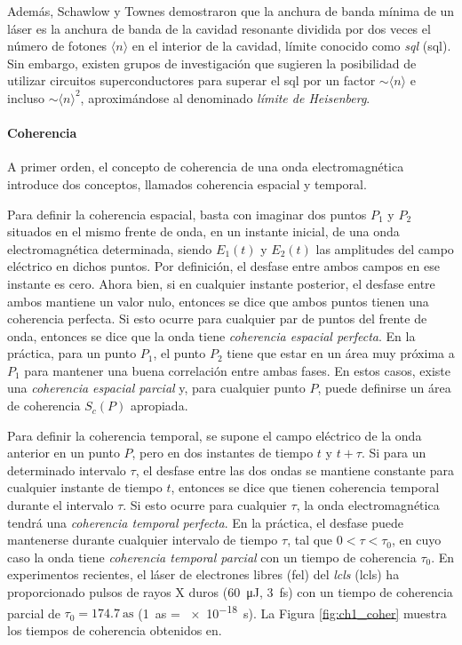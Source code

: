 Además, Schawlow y Townes demostraron que la anchura de banda mínima de un láser es la anchura de banda de la cavidad resonante dividida por dos veces el número de fotones $\langle n\rangle$ en el interior de la cavidad, límite conocido como \emph{\acrlong{sql}} (\acrshort{sql}). Sin embargo, existen grupos de investigación\autocite{Liu2021ProposalLimit} que sugieren la posibilidad de utilizar circuitos superconductores para superar el \acrshort{sql} por un factor $\sim\langle n\rangle$ e incluso $\sim\langle n\rangle^2$, aproximándose al denominado \emph{límite de Heisenberg}.

\paragraph{Coherencia}\label{par:1.1.2.2}
A primer orden, el concepto de coherencia de una onda electromagnética introduce dos conceptos, llamados coherencia espacial y temporal\autocite{Svelto2010PrinciplesLasers}.

Para definir la coherencia espacial, basta con imaginar dos puntos $P_1$ y $P_2$ situados en el mismo frente de onda, en un instante inicial, de una onda electromagnética determinada, siendo $E_1(t)$ y $E_2(t)$ las amplitudes del campo eléctrico en dichos puntos. Por definición, el desfase entre ambos campos en ese instante es cero. Ahora bien, si en cualquier instante posterior, el desfase entre ambos mantiene un valor nulo, entonces se dice que ambos puntos tienen una coherencia perfecta. Si esto ocurre para cualquier par de puntos del frente de onda, entonces se dice que la onda tiene \emph{coherencia espacial perfecta}. En la práctica, para un punto $P_1$, el punto $P_2$ tiene que estar en un área muy próxima a $P_1$ para mantener una buena correlación entre ambas fases. En estos casos, existe una \emph{coherencia espacial parcial} y, para cualquier punto $P$, puede definirse un área de coherencia $S_c(P)$ apropiada.

Para definir la coherencia temporal, se supone el campo eléctrico de la onda anterior en un punto $P$, pero en dos instantes de tiempo $t$ y $t+\tau$. Si para un determinado intervalo $\tau$, el desfase entre las dos ondas se mantiene constante para cualquier instante de tiempo $t$, entonces se dice que tienen coherencia temporal durante el intervalo $\tau$. Si esto ocurre para cualquier $\tau$, la onda electromagnética tendrá una \emph{coherencia temporal perfecta}. En la práctica, el desfase puede mantenerse durante cualquier intervalo de tiempo $\tau$, tal que $0<\tau<\tau_0$, en cuyo caso la onda tiene \emph{coherencia temporal parcial} con un tiempo de coherencia $\tau_0$. En experimentos recientes\autocite{Zhou2020AttosecondLaser}, el láser de electrones libres (\acrshort{fel}) del \emph{\acrlong{lcls}} (\acrshort{lcls}) ha proporcionado pulsos de rayos X duros (\qty{60}{\uJ}, \qty{3}{\fs}) con un tiempo de coherencia parcial de $\tau_0 = \qty{174,7}{\as}$ (\qty{1}{\as} = \qty{e-18}{\s}). La Figura \ref{fig:ch1_coher} muestra los tiempos de coherencia obtenidos en\autocite{Zhou2020AttosecondLaser}. 

